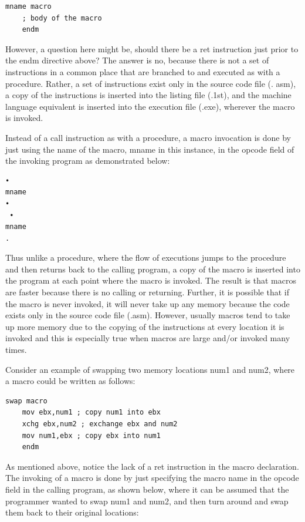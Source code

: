 \documentclass[10pt]{book}
\begin{document}
\begin{verbatim}
mname macro
    ; body of the macro
    endm
\end{verbatim}

However, a question here might be, should there be a ret instruction just prior to the endm directive above? The answer is no, because there is not a set of instructions in a common place that are branched to and executed as with a procedure. Rather, a set of instructions exist only in the source code file (. asm), a copy of the instructions is inserted into the listing file (.1st), and the machine language equivalent is inserted into the execution file (.exe), wherever the macro is invoked.

Instead of a call instruction as with a procedure, a macro invocation is done by just using the name of the macro, mname in this instance, in the opcode field of the invoking program as demonstrated below:


\begin{verbatim}
•
mname
•
 •
mname
.
\end{verbatim}

Thus unlike a procedure, where the flow of executions jumps to the procedure and then returns back to the calling program, a copy of the macro is inserted into the program at each point where the macro is invoked. The result is that macros are faster because there is no calling or returning. Further, it is possible that if the macro is never invoked, it will never take up any memory because the code exists only in the source code file (.asm). However, usually macros tend to take up more memory due to the copying of the instructions at every location it is invoked and this is especially true when macros are large and/or invoked many times.

Consider an example of swapping two memory locations num1 and num2, where a macro could be written as follows:

\begin{verbatim}
swap macro
    mov ebx,num1 ; copy num1 into ebx
    xchg ebx,num2 ; exchange ebx and num2
    mov num1,ebx ; copy ebx into num1
    endm
\end{verbatim}

As mentioned above, notice the lack of a ret instruction in the macro declaration. The invoking of a macro is done by just specifying the macro name in the opcode field in the calling program, as shown below, where it can be assumed that the programmer wanted to swap num1 and num2, and then turn around and swap them back to their original locations:
\end{document}
